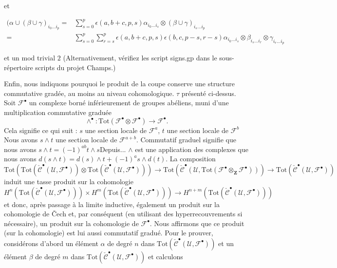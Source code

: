 et

\begin{align*}
(\alpha \cup (\beta \cup \gamma)_{i_0\ldots i_p}
= &
\sum\nolimits_{s = 0}^p
\epsilon(a, b + c, p, s)
\alpha_{i_0 \ldots i_s} \otimes (\beta \cup \gamma)_{i_s \ldots i_p}
\\
= &
\sum\nolimits_{s = 0}^p
\sum\nolimits_{r = s}^p
\epsilon(a, b + c, p, s) \epsilon(b, c, p - s, r - s)
\alpha_{i_0 \ldots i_s} \otimes \beta_{i_s \ldots i_r} \otimes
\gamma_{i_r \ldots i_p}
\end{align*}

et un mod trivial $2$ (Alternativement, vérifiez les script signs.gp dans le sous-répertoire scripts du projet Champs.)

\medskip\noindent

Enfin, nous indiquons pourquoi le produit de la coupe conserve une structure commutative gradée, au moins au niveau cohomologique.
$\tau$ présenté ci-dessus. Soit ${\mathcal F}^\bullet$ un complexe borné inférieurement de groupes abéliens, muni d'une multiplication commutative graduée
$$
\wedge^\bullet :
\text{Tot}({\mathcal F}^\bullet\otimes {\mathcal F}^\bullet)
\longrightarrow
{\mathcal F}^\bullet.
$$
Cela signifie ce qui suit : $s$ une section locale de
${\mathcal F}^a$, $t$ une section locale de ${\mathcal F}^b$
Nous avons $s \wedge t$ une section locale de ${\mathcal F}^{a + b}$. Commutatif graduel signifie que nous avons
$s \wedge t = (-1)^{ab} t \wedge s$Depuis... $\wedge$ est une application des complexes que nous avons
$d(s\wedge t) = d(s) \wedge t + (-1)^a s \wedge d(t)$. La composition
$$
\text{Tot}(
\text{Tot}(\check{\mathcal{C}}^\bullet({\mathcal U}, {\mathcal F}^\bullet))
\otimes
\text{Tot}(\check{\mathcal{C}}^\bullet({\mathcal U}, {\mathcal F}^\bullet))
)
\to
\text{Tot}(
\check{\mathcal{C}}^\bullet({\mathcal U},
\text{Tot}({\mathcal F}^\bullet\otimes_{\mathbf Z}{\mathcal F}^\bullet))
)
\to
\text{Tot}(\check{\mathcal{C}}^\bullet({\mathcal U}, {\mathcal F}^\bullet))
$$
induit une tasse produit sur la cohomologie
$$
H^n(
\text{Tot}(\check{\mathcal{C}}^\bullet({\mathcal U}, {\mathcal F}^\bullet))
)
\times
H^m(
\text{Tot}(\check{\mathcal{C}}^\bullet({\mathcal U}, {\mathcal F}^\bullet))
)
\longrightarrow
H^{n + m}(
\text{Tot}(\check{\mathcal{C}}^\bullet({\mathcal U}, {\mathcal F}^\bullet))
)
$$
et donc, après passage à la limite inductive, également un produit sur la cohomologie de {\v C}ech et, par conséquent (en utilisant des hyperrecouvrements si nécessaire), un produit sur la cohomologie de ${\mathcal F}^\bullet$. Nous affirmons que ce produit (sur la cohomologie) est lui aussi commutatif gradué. Pour le prouver, considérons d'abord un élément $\alpha$ de degré $n$ dans
$\text{Tot}(\check{\mathcal{C}}^\bullet({\mathcal U}, {\mathcal F}^\bullet))$
et un élément $\beta$ de degré $m$ dans
$\text{Tot}(\check{\mathcal{C}}^\bullet({\mathcal U}, {\mathcal F}^\bullet))$
et calculons

